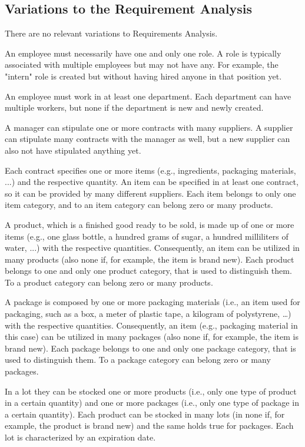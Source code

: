 \subsection{Variations to the Requirement Analysis}

There are no relevant variations to Requirements Analysis.

An employee must necessarily have one and only one role. A role is typically associated with multiple employees but may not have any. For example, the "intern" role is created but without having hired anyone in that position yet.

An employee must work in at least one department. Each department can have multiple workers, but none if the department is new and newly created.

A manager can stipulate one or more contracts with many suppliers. A supplier can stipulate many contracts with the manager as well, but a new supplier can also not have stipulated anything yet.

Each contract specifies one or more items (e.g., ingredients, packaging materials, ...) and the respective quantity. An item can be specified in at least one contract, so it can be provided by many different suppliers. Each item belongs to only one item category, and to an item category can belong zero or many products.

A product, which is a finished good ready to be sold, is made up of one or more items (e.g., one glass bottle, a hundred grams of sugar, a hundred milliliters of water, ...) with the respective quantities. Consequently, an item can be utilized in many products (also none if, for example, the item is brand new). Each product belongs to one and only one product category, that is used to distinguish them. To a product category can belong zero or many products.

A package is composed by one or more packaging materials (i.e., an item used for packaging, such as a box, a meter of plastic tape, a kilogram of polystyrene, …) with the respective quantities. Consequently, an item (e.g., packaging material in this case) can be utilized in many packages (also none if, for example, the item is brand new). Each package belongs to one and only one package category, that is used to distinguish them. To a package category can belong zero or many packages.

In a lot they can be stocked one or more products (i.e., only one type of product in a certain quantity) and one or more packages (i.e., only one type of package in a certain quantity). Each product can be stocked in many lots (in none if, for example, the product is brand new) and the same holds true for packages. Each lot is characterized by an expiration date.

